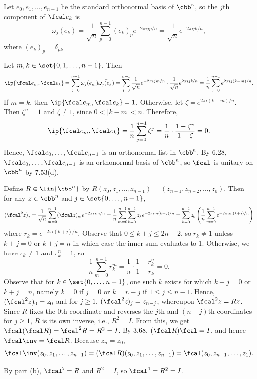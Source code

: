 \begin{sol}
    Let $e_0, e_1, \ldots, e_{n-1}$ be the standard orthonormal basis of $\cbb^n$, so the $j$th component of $\fcal e_k$ is
    \[
        \omega_j(e_k) = \frac{1}{\sqrt{n}} \sum_{p=0}^{n-1} (e_k)_p e^{-2\pi i jp/n} = \frac{1}{\sqrt{n}} e^{-2\pi i jk/n},
    \]
    where $(e_k)_p = \delta_{pk}$.
    \begin{subexercises}
        \item Let $m, k \in \set{0, 1, \ldots, n-1}$.
        Then
        \[
            \ip{\fcal e_m, \fcal e_k} = \sum_{j=0}^{n-1} \omega_j(e_m) \bar{\omega_j(e_k)} = \sum_{j=0}^{n-1} \frac{1}{\sqrt{n}} e^{-2\pi i jm/n} \cdot \frac{1}{\sqrt{n}} e^{2\pi i jk/n} = \frac{1}{n} \sum_{j=0}^{n-1} e^{2\pi i j(k-m)/n}.
        \]
        If $m = k$, then $\ip{\fcal e_m, \fcal e_k} = 1$.
        Otherwise, let $\zeta = e^{2\pi i (k-m)/n}$.
        Then $\zeta^n = 1$ and $\zeta \neq 1$, since $0 < |k-m| < n$.
        Therefore,
        \[
            \ip{\fcal e_m, \fcal e_k} = \frac{1}{n} \sum_{j=0}^{n-1} \zeta^j = \frac{1}{n} \cdot \frac{1 - \zeta^n}{1-\zeta} = 0.
        \]
        Hence, $\fcal e_0, \ldots, \fcal e_{n-1}$ is an orthonormal list in $\cbb^n$.
        By 6.28, $\fcal e_0, \ldots, \fcal e_{n-1}$ is an orthonormal basis of $\cbb^n$, so $\fcal$ is unitary on $\cbb^n$ by 7.53(d).
        \item Define $R \in \lin{\cbb^n}$ by $R(z_0, z_1, \ldots, z_{n-1}) = (z_{n-1}, z_{n-2}, \ldots, z_0)$.
        Then for any $z \in \cbb^n$ and $j \in \set{0, \ldots, n - 1}$,
        \[
            (\fcal^2 z)_j = \frac{1}{\sqrt n}\sum_{m=0}^{n-1} (\fcal z)_m e^{-2\pi i jm/n} = \frac 1n \sum_{m=0}^{n-1} \sum_{k=0}^{n-1} z_k e^{-2\pi i m(k+j)/n} = \sum_{k=0}^{n-1} z_k \left( \frac 1n \sum_{m=0}^{n-1} e^{-2\pi i m(k+j)/n} \right)
        \]
        where $r_k = e^{-2\pi i (k+j)/n}$.
        Observe that $0 \leq k+j \leq 2n-2$, so $r_k \neq 1$ unless $k+j = 0$ or $k+j = n$ in which case the inner sum evaluates to 1.
        Otherwise, we have $r_k \neq 1$ and $r_k^n = 1$, so
        \[
            \frac 1n \sum_{m=0}^{n-1} r_k^m = \frac 1n \cdot \frac{1 - r_k^n}{1-r_k} = 0.
        \]
        Observe that for $k \in \set{0, \ldots, n-1}$, one such $k$ exists for which $k+j = 0$ or $k+j = n$, namely $k = 0$ if $j = 0$ or $k = n-j$ if $1 \leq j \leq n-1$.
        Hence, $(\fcal^2 z)_0 = z_0$ and for $j \geq 1$, $(\fcal^2 z)_j = z_{n-j}$, whereupon $\fcal^2 z = Rz$.
        Since $R$ fixes the $0$th coordinate and reverses the $j$th and $(n-j)$th coordinates for $j \geq 1$, $R$ is its own inverse, i.e., $R^2 = I$.
        From this, we get $\fcal(\fcal R) = \fcal^2 R = R^2 = I$.
        By 3.68, $(\fcal R)\fcal = I$, and hence $\fcal\inv = \fcal R$.
        Because $z_n = z_0$,
        \[
            \fcal\inv(z_0, z_1, \ldots, z_{n-1}) = (\fcal R)(z_0, z_1, \ldots, z_{n-1}) = \fcal(z_0, z_{n-1}, \ldots, z_1).
        \]
        \item By part (b), $\fcal^2 = R$ and $R^2 = I$, so $\fcal^4 = R^2 = I$. \qedhere
    \end{subexercises}
\end{sol}

